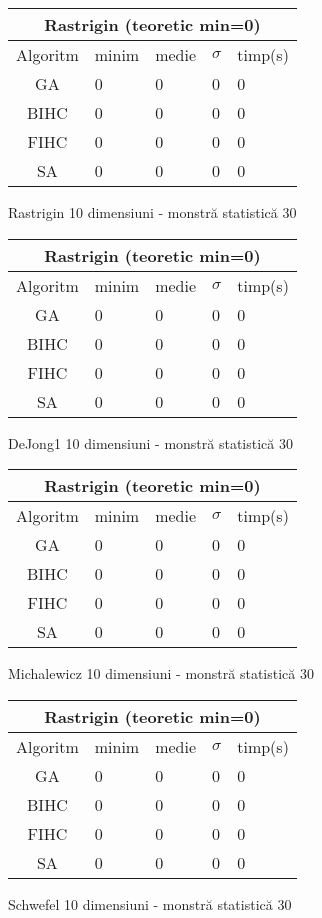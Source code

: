 \documentclass{article}
\begin{document}
\begin{figure}[!h]
\begin{tabular}{||c|||l|l|l|l||}
  \hline
  \multicolumn{5}{||c||}{Rastrigin (teoretic min=0)} \\ \hline
  Algoritm & minim & medie & $\sigma$ & timp(s) \\ \hline \hline
  GA & 0 & 0 & 0 & 0 \\ \hline
  BIHC & 0 & 0 & 0 & 0\\ \hline
  FIHC & 0 & 0 & 0 & 0 \\ \hline
  SA & 0 & 0 & 0 & 0 \\ \hline
\end{tabular}
\caption{Rastrigin 10 dimensiuni - monstră statistică 30} 
\end{figure}

\begin{figure}[!h]
\begin{tabular}{||c|||l|l|l|l||}
  \hline
  \multicolumn{5}{||c||}{Rastrigin (teoretic min=0)} \\ \hline
  Algoritm & minim & medie & $\sigma$ & timp(s) \\ \hline \hline
  GA & 0 & 0 & 0 & 0 \\ \hline
  BIHC & 0 & 0 & 0 & 0\\ \hline
  FIHC & 0 & 0 & 0 & 0 \\ \hline
  SA & 0 & 0 & 0 & 0 \\ \hline
\end{tabular}
\caption{DeJong1 10 dimensiuni - monstră statistică 30} 
\end{figure}

\begin{figure}[!h]
\begin{tabular}{||c|||l|l|l|l||}
  \hline
  \multicolumn{5}{||c||}{Rastrigin (teoretic min=0)} \\ \hline
  Algoritm & minim & medie & $\sigma$ & timp(s) \\ \hline \hline
  GA & 0 & 0 & 0 & 0 \\ \hline
  BIHC & 0 & 0 & 0 & 0\\ \hline
  FIHC & 0 & 0 & 0 & 0 \\ \hline
  SA & 0 & 0 & 0 & 0 \\ \hline
\end{tabular}
\caption{Michalewicz 10 dimensiuni - monstră statistică 30} 
\end{figure}

\begin{figure}[!h]
\begin{tabular}{||c|||l|l|l|l||}
  \hline
  \multicolumn{5}{||c||}{Rastrigin (teoretic min=0)} \\ \hline
  Algoritm & minim & medie & $\sigma$ & timp(s) \\ \hline \hline
  GA & 0 & 0 & 0 & 0 \\ \hline
  BIHC & 0 & 0 & 0 & 0\\ \hline
  FIHC & 0 & 0 & 0 & 0 \\ \hline
  SA & 0 & 0 & 0 & 0 \\ \hline
\end{tabular}
\caption{Schwefel 10 dimensiuni - monstră statistică 30} 
\end{figure}
\end{document}
